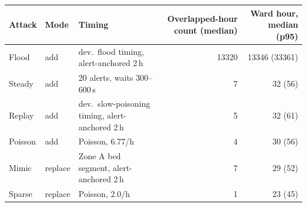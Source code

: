 \begin{tabular}{l l l r r}
\toprule
Attack & Mode & Timing & Overlapped-hour count (median) & Ward hour, median (p95) \\
\midrule
Flood & add & dev.\ flood timing, alert-anchored 2\,h & 13320 & 13346 (33361) \\
Steady & add & 20 alerts, waits 300--600\,s & 7 & 32 (56) \\
Replay & add & dev.\ slow-poisoning timing, alert-anchored 2\,h & 5 & 32 (61) \\
Poisson & add & Poisson, 6.77/h & 4 & 30 (56) \\
Mimic & replace & Zone A bed segment, alert-anchored 2\,h & 7 & 29 (52) \\
Sparse & replace & Poisson, 2.0/h & 1 & 23 (45) \\
\bottomrule
\end{tabular}
